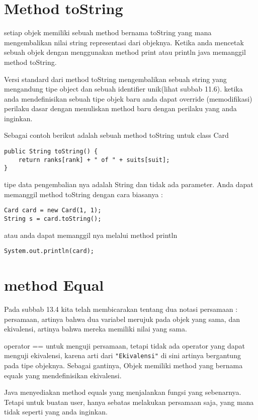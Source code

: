 \section{Method toString} %

setiap objek memiliki sebuah method bernama toString yang mana mengembalikan nilai string representasi dari objeknya. Ketika anda mencetak sebuah objek dengan menggunakan method print atau println java memanggil method toString.

Versi standard dari method toString mengembalikan sebuah string yang mengandung tipe object dan sebuah identifier unik(lihat subbab 11.6). ketika anda mendefinisikan sebuah tipe objek baru anda dapat override (memodifikasi) perilaku dasar dengan menuliskan method baru dengan perilaku yang anda inginkan.

Sebagai contoh berikut adalah sebuah method toString untuk class Card
\begin{lstlisting}
public String toString() {
	return ranks[rank] + " of " + suits[suit];
}
\end{lstlisting}

tipe data pengembalian nya adalah String dan tidak ada parameter. Anda dapat memanggil method toString dengan cara biasanya :

\begin{lstlisting}
Card card = new Card(1, 1);
String s = card.toString();
\end{lstlisting}

atau anda dapat memanggil nya melalui method println 
\begin{lstlisting}
System.out.println(card);
\end{lstlisting}

\section{method Equal} %

Pada subbab 13.4 kita telah membicarakan tentang dua notasi persamaan : persamaan, artinya bahwa dua variabel merujuk pada objek yang sama, dan ekivalensi, artinya bahwa mereka memiliki nilai yang sama.

operator == untuk menguji persamaan, tetapi tidak ada operator yang dapat menguji ekivalensi, karena arti dari \texttt{"Ekivalensi"} di sini artinya bergantung pada tipe objeknya. Sebagai gantinya, Objek memiliki method yang bernama equals yang mendefinisikan ekivalensi.

Java menyediakan method equals yang menjalankan fungsi yang sebenarnya. Tetapi untuk buatan user, hanya sebatas melakukan persamaan saja, yang mana tidak seperti yang anda inginkan.

